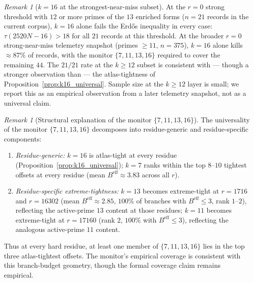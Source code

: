 \documentclass[11pt]{article}
\renewcommand{\_}{\origunderscore\allowbreak}
\theoremstyle{definition}
\theoremstyle{remark}
\newtheorem{remark}[theorem]{Remark}
\begin{document}
\begin{remark}[$k=16$ at the strongest-near-miss subset]\label{rem:k16_strong_layer}
At the $r=0$ strong threshold with $12$ or more primes of the $13$
enriched forms ($n = 21$ records in the current corpus), $k=16$ alone
fails the Erd\H{o}s inequality in every case: $\tau(2520N-16) > 18$
for all $21$ records at this threshold.  At the broader $r=0$
strong-near-miss telemetry snapshot (primes $\ge 11$, $n = 375$), $k=16$ alone
kills $\approx 87\%$ of records, with the monitor $\{7, 11, 13, 16\}$
required to cover the remaining $44$.  The $21/21$ rate at the
$k\ge 12$ subset is consistent with — though a stronger observation
than — the atlas-tightness of
Proposition~\ref{prop:k16_universal}.  Sample size at the
$k\ge 12$ layer is small; we report this as an empirical observation
from a later telemetry snapshot, not as a universal claim.
\end{remark}

\begin{remark}[Structural explanation of the monitor $\{7,11,13,16\}$]\label{rem:monitor_structural}
The universality of the monitor $\{7,11,13,16\}$ decomposes into
residue-generic and residue-specific components:
\begin{enumerate}
\item \emph{Residue-generic:} $k=16$ is atlas-tight at every
residue (Proposition~\ref{prop:k16_universal}); $k=7$ ranks
within the top $8$--$10$ tightest offsets at every residue (mean
$B^{\mathrm{eff}}\approx 3.83$ across all $r$).
\item \emph{Residue-specific extreme-tightness:}
$k=13$ becomes extreme-tight at $r=1716$ and $r=16302$ (mean
$B^{\mathrm{eff}}\approx 2.85$, $100\%$ of branches with
$B^{\mathrm{eff}}\le 3$, rank $1$--$2$), reflecting the active-prime
$13$ content at those residues; $k=11$ becomes extreme-tight at
$r=17160$ (rank $2$, $100\%$ with $B^{\mathrm{eff}}\le 3$),
reflecting the analogous active-prime $11$ content.
\end{enumerate}
Thus at every hard residue, at least one member of $\{7,11,13,16\}$
lies in the top three atlas-tightest offsets. The monitor's
empirical coverage is consistent with this branch-budget geometry,
though the formal coverage claim remains empirical.
\end{remark}
\end{document}
